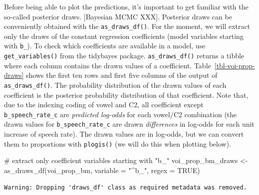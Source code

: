 \documentclass[
  authoryear,
  preprint,
  3p]{elsarticle}
\newenvironment{Shaded}{\begin{snugshade}}{\end{snugshade}}
\newcommand{\AttributeTok}[1]{\textcolor[rgb]{0.40,0.45,0.13}{#1}}
\newcommand{\CommentTok}[1]{\textcolor[rgb]{0.37,0.37,0.37}{#1}}
\newcommand{\ConstantTok}[1]{\textcolor[rgb]{0.56,0.35,0.01}{#1}}
\newcommand{\FunctionTok}[1]{\textcolor[rgb]{0.28,0.35,0.67}{#1}}
\newcommand{\NormalTok}[1]{\textcolor[rgb]{0.00,0.23,0.31}{#1}}
\newcommand{\OtherTok}[1]{\textcolor[rgb]{0.00,0.23,0.31}{#1}}
\newcommand{\StringTok}[1]{\textcolor[rgb]{0.13,0.47,0.30}{#1}}
\begin{document}
Before being able to plot the predictions, it's important to get
familiar with the so-called posterior draws. {[}Bayesian MCMC XXX{]}.
Posterior draws can be conveniently obtained with the
\texttt{as\_draws\_df()}. For the moment, we will extract only the draws
of the constant regression coefficients (model variables starting with
\texttt{b\_}). To check which coefficients are available in a model, use
\texttt{get\_variables()} from the tidybayes package.
\texttt{as\_draws\_df()} returns a tibble where each column contains the
drawn values of a coefficient. Table~\ref{tbl-voi-prop-draws} shows the
first ten rows and first five columns of the output of
\texttt{as\_draws\_df()}. The probability distribution of the drawn
values of each coefficient is the posterior probability distribution of
that coefficient. Note that, due to the indexing coding of vowel and C2,
all coefficient except \texttt{b\_speech\_rate\_c} are \emph{predicted
log-odds} for each vowel/C2 combination (the drawn values for
\texttt{b\_speech\_rate\_c} are drawn \emph{differences} in log-odds for
each unit increase of speech rate). The drawn values are in log-odds,
but we can convert them to proportions with \texttt{plogis()} (we will
do this when plotting below).

\begin{Shaded}
\begin{Highlighting}[]
\CommentTok{\# extract only coefficient variables starting with "b\_"}
\NormalTok{voi\_prop\_bm\_draws }\OtherTok{\textless{}{-}} \FunctionTok{as\_draws\_df}\NormalTok{(voi\_prop\_bm, }\AttributeTok{variable =} \StringTok{"\^{}b\_"}\NormalTok{, }\AttributeTok{regex =} \ConstantTok{TRUE}\NormalTok{)}
\end{Highlighting}
\end{Shaded}

\begin{verbatim}
Warning: Dropping 'draws_df' class as required metadata was removed.
\end{verbatim}
\end{document}
